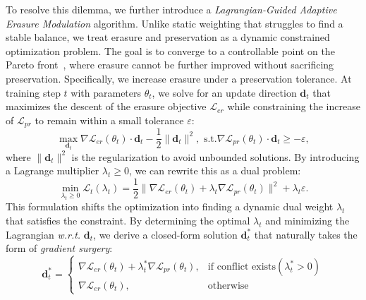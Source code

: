 To resolve this dilemma, we further introduce a \emph{Lagrangian-Guided Adaptive Erasure Modulation} algorithm. Unlike static weighting that struggles to find a stable balance, we treat erasure and preservation as a dynamic constrained optimization problem. The goal is to converge to a controllable point on the Pareto front~\cite{yu2020gradientsurgerymultitasklearning}, where erasure cannot be further improved without sacrificing preservation. 
Specifically, we increase erasure under a preservation tolerance. At training step $t$ with parameters $\theta_t$, we solve for an update direction $\mathbf{d}_t$ that maximizes the descent of the erasure objective $\mathcal{L}_{er}$ while constraining the increase of $\mathcal{L}_{pr}$ to remain within a small tolerance $\varepsilon$:
\begin{equation}
\label{eq: our goal}
    \max_{\mathbf{d}_t} \nabla \mathcal{L}_{er}(\theta_t) \cdot \mathbf{d}_t - \frac{1}{2}\|\mathbf{d}_t\|^2 
    , \,\,
    \text{s.t.} \nabla \mathcal{L}_{pr}(\theta_t) \cdot \mathbf{d}_t \ge -\varepsilon,
\end{equation}
where $\|\mathbf{d}_t\|^2$ is the regularization to avoid unbounded solutions. By introducing a Lagrange multiplier $\lambda_t \ge 0$, we can rewrite this as a dual problem:
\begin{equation}
\label{eq: dual problem}
    \min_{\lambda_t \ge 0} \mathcal{L}_{t}(\lambda_t) =  \frac12 \big\| \nabla \mathcal L_{er}(\theta_t) + \lambda_t \nabla \mathcal L_{pr}(\theta_t) \big\|^2 + \lambda_t \varepsilon.
\end{equation}
This formulation shifts the optimization into finding a dynamic dual weight $\lambda_t$ that satisfies the constraint. By determining the optimal $\lambda_t$ and minimizing the Lagrangian \textit{w.r.t.} $\mathbf{d}_t$, we derive a closed-form solution $\mathbf{d}^*_t$ that naturally takes the form of \emph{gradient surgery}:
\begin{equation}
\label{eq: dt closed-form solution}
    \mathbf{d}^*_t = \begin{cases} 
\nabla \mathcal{L}_{er}(\theta_t) + \lambda^*_t \nabla \mathcal{L}_{pr}(\theta_t), & \text{if } \text{conflict exists} (\lambda_t^* > 0) \\
\nabla \mathcal{L}_{er}(\theta_t), & \text{otherwise}
\end{cases}
\end{equation}

